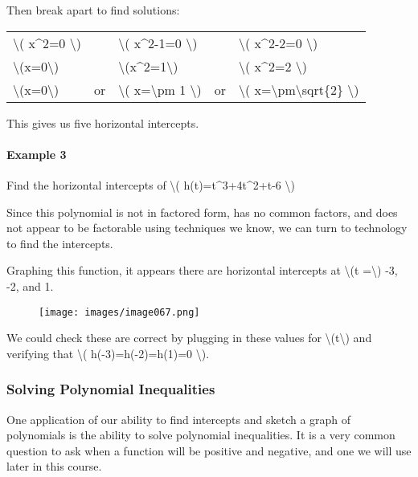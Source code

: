 Then break apart to find solutions:

\begin{longtable}[]{@{}lllll@{}}
\toprule
\endhead
\textbackslash{}( x\^{}2=0 \textbackslash{}) & & \textbackslash{}(
x\^{}2-1=0 \textbackslash{}) & & \textbackslash{}( x\^{}2-2=0
\textbackslash{})\tabularnewline
\textbackslash{}(x=0\textbackslash{}) & &
\textbackslash{}(x\^{}2=1\textbackslash{}) & & \textbackslash{}(
x\^{}2=2 \textbackslash{})\tabularnewline
\textbackslash{}(x=0\textbackslash{}) & or & \textbackslash{}(
x=\textbackslash{}pm 1 \textbackslash{}) & or & \textbackslash{}(
x=\textbackslash{}pm\textbackslash{}sqrt\{2\}
\textbackslash{})\tabularnewline
\bottomrule
\end{longtable}

This gives us five horizontal intercepts.

\hypertarget{example-3}{%
\paragraph{Example 3}\label{example-3}}

Find the horizontal intercepts of \textbackslash{}(
h(t)=t\^{}3+4t\^{}2+t-6 \textbackslash{})

Since this polynomial is not in factored form, has no common factors,
and does not appear to be factorable using techniques we know, we can
turn to technology to find the intercepts.

Graphing this function, it appears there are horizontal intercepts at
\textbackslash{}(t =\textbackslash{}) -3, -2, and 1.

\begin{figure}
\centering
\texttt{[image: images/image067.png]}
\caption{}
\end{figure}

We could check these are correct by plugging in these values for
\textbackslash{}(t\textbackslash{}) and verifying that \textbackslash{}(
h(-3)=h(-2)=h(1)=0 \textbackslash{}).

\hypertarget{solving-polynomial-inequalities}{%
\subsubsection{Solving Polynomial
Inequalities}\label{solving-polynomial-inequalities}}

One application of our ability to find intercepts and sketch a graph of
polynomials is the ability to solve polynomial inequalities. It is a
very common question to ask when a function will be positive and
negative, and one we will use later in this course.

